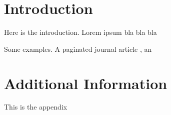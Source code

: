 \documentclass[sigconf]{acmart}
\begin{document}

\maketitle

\section{Introduction}
Here is the introduction. Lorem ipsum bla bla bla



Some examples.  A paginated journal article \cite{Abril07}, an





\appendix

\section{Additional Information}
This is the appendix
\end{document}
